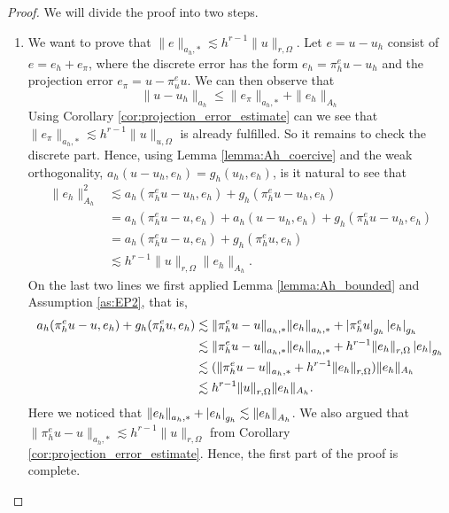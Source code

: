 \begin{proof}
    We will divide the proof into two steps.
    \begin{enumerate}[label=\arabic*)]
        \item We want to prove that $\| e \|_{ a_{h},* }^{  } \lesssim   h^{r-1} \| u \|_{ r,\Omega  }^{  }$.
    Let $e = u - u_{h}$ consist of $e = e_{h} + e_{\pi }$, where the discrete error has the form $e_{h} = \pi _{h}^{e} u - u_{h}$ and the projection error $e_{\pi } = u - \pi _{u} ^{e}u$. We can then observe that \[
    \| u - u_{h} \|_{ a_{h} }^{  }  \le \| e_{\pi } \|_{a_{h},*}^{  } + \| e_{h} \|_{A_{h}  }^{  }
    \]
Using Corollary \ref{cor:projection_error_estimate} can we see that $\| e_{\pi } \|_{a_{h},*}^{  } \lesssim h^{r-1} \| u \|_{ u,\Omega  }^{  }  $ is already fulfilled. So it remains to check the discrete part. Hence, using Lemma
\ref{lemma:Ah_coercive} and
the weak orthogonality, $ a_{h}( u - u_{h}, e_{h}) = g_{h}( u_{h}, e_{h})$, is it natural to see that \[
    \begin{split}
\| e_{h} \|_{ A_{h} }^{ 2 } & \lesssim a_{h}( \pi _{h}^{e} u - u_{h}, e_{h}) + g_{h}( \pi _{h}^{e}u - u_{h}, e_{h}) \\
 & = a_{h}( \pi _{h}^{e} u - u, e_{h}) + a_{h}( u - u_{h}, e_{h}) + g_{h}( \pi _{h}^{e}u - u_{h}, e_{h}) \\
 & = a_{h}( \pi _{h}^{e} u - u, e_{h}) + g_{h}( \pi _{h}^{e}u, e_{h}) \\
 & \lesssim h^{r-1} \| u \|_{ r, \Omega  }^{  } \| e_{h} \|_{ A_{h} }^{  }.
    \end{split}
\]
On the last two lines we first applied Lemma \ref{lemma:Ah_bounded} and Assumption \ref{as:EP2}, that is, \[
    \begin{split}
        a_{h}( \pi _{h}^{e} u - u, e_{h}) + g_{h}( \pi _{h}^{e}u, e_{h}) &\lesssim \| \pi _{h}^{e} u - u \|_{a_{h},*  }^{  } \| e_{h} \|_{a_{h},*  }^{  }
        + \left\lvert  \pi _{h}^{e}u  \right\rvert_{g_{h}} \left\lvert e_{h}   \right\rvert_{g_{h}} \\
         &\lesssim \| \pi _{h}^{e} u - u \|_{a_{h},*  }^{  } \| e_{h} \|_{a_{h},*  }^{  } + h^{r-1} \| e_{h} \|_{r, \Omega   }^{  }\left\lvert e_{h}   \right\rvert_{g_{h}} \\
         &\lesssim (\| \pi _{h}^{e} u - u \|_{a_{h},*  }^{  } + h^{r-1} \| e_{h} \|_{r, \Omega   }^{  }) \|e_{h}\|_{A_{h}} \\
         &\lesssim  h^{r-1} \| u \|_{r, \Omega   }^{  } \|e_{h}\|_{A_{h}}.
    \end{split}
\]
Here we noticed that $\| e_{h} \|_{a_{h},*  }^{  } + \left\lvert e_{h}   \right\rvert_{g_{h}} \lesssim \| e_{h} \|_{ A_{h} }^{  }  $. We also argued that $\| \pi _{h}^{e} u - u \|_{a_{h},*  }^{  } \lesssim h^{r-1}\| u \|_{ r,\Omega  }^{  }  $ from Corollary \ref{cor:projection_error_estimate}.
Hence, the first part of the proof is complete.


\end{enumerate}
\end{proof}
